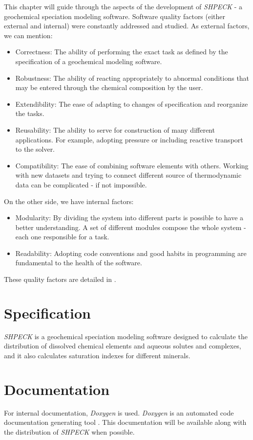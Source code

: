 This chapter will guide through the aspects of the development of \emph{SHPECK} - a geochemical speciation modeling software. Software quality factors (either external and internal) were constantly addressed and studied. As external factors, we can mention:
\begin{itemize}
\item Correctness: The ability of performing the exact task as defined by the specification of a geochemical modeling software.
\item Robustness: The ability of reacting appropriately to abnormal conditions that may be entered through the chemical composition by the user.
\item Extendibility: The ease of adapting to changes of specification and reorganize the tasks.
\item Reusability: The ability to serve for construction of many different applications. For example, adopting  pressure or including reactive transport to the solver.
\item Compatibility: The ease of combining software elements with others. Working with new datasets and trying to connect different source of thermodynamic data can be complicated - if not impossible.
\end{itemize}
On the other side, we have internal factors:
\begin{itemize}
\item Modularity: By dividing the system into different parts is possible to have a better understanding. A set of different modules compose the whole system - each one responsible for a task.
\item Readability: Adopting code conventions and good habits in programming are fundamental to the health of the software.
\end{itemize}
These quality factors are detailed in \cite{Meyer:00}.

\section{Specification}
\emph{SHPECK} is a geochemical speciation modeling software designed to calculate the distribution of dissolved chemical elements and aqueous solutes and complexes, and it also calculates saturation indexes for different minerals. 

\section{Documentation}
For internal documentation, \emph{Doxygen} is used. \emph{Doxygen} is an automated code documentation generating tool \cite{Heesch:13}. This documentation will be available along with the distribution of \emph{SHPECK} when possible.

